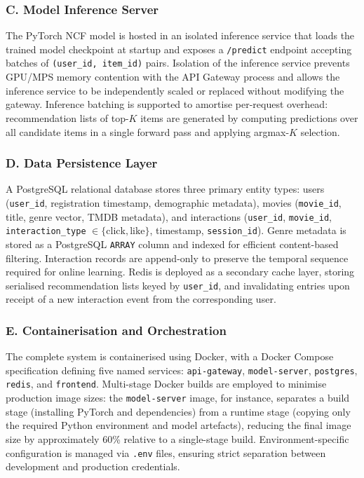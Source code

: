 \documentclass[
]{IEEEtran}
\begin{document}
\subsubsection{C. Model Inference
Server}\label{c.-model-inference-server}

The PyTorch NCF model is hosted in an isolated inference service that
loads the trained model checkpoint at startup and exposes a
\texttt{/predict} endpoint accepting batches of
\texttt{(user\_id,\ item\_id)} pairs. Isolation of the inference service
prevents GPU/MPS memory contention with the API Gateway process and
allows the inference service to be independently scaled or replaced
without modifying the gateway. Inference batching is supported to
amortise per-request overhead: recommendation lists of top-\(K\) items
are generated by computing predictions over all candidate items in a
single forward pass and applying argmax-\(K\) selection.

\subsubsection{D. Data Persistence
Layer}\label{d.-data-persistence-layer}

A PostgreSQL relational database stores three primary entity types:
users (\texttt{user\_id}, registration timestamp, demographic metadata),
movies (\texttt{movie\_id}, title, genre vector, TMDB metadata), and
interactions (\texttt{user\_id}, \texttt{movie\_id},
\texttt{interaction\_type} \(\in \{\text{click}, \text{like}\}\),
timestamp, \texttt{session\_id}). Genre metadata is stored as a
PostgreSQL \texttt{ARRAY} column and indexed for efficient content-based
filtering. Interaction records are append-only to preserve the temporal
sequence required for online learning. Redis is deployed as a secondary
cache layer, storing serialised recommendation lists keyed by
\texttt{user\_id}, and invalidating entries upon receipt of a new
interaction event from the corresponding user.

\subsubsection{E. Containerisation and
Orchestration}\label{e.-containerisation-and-orchestration}

The complete system is containerised using Docker, with a Docker Compose
specification defining five named services: \texttt{api-gateway},
\texttt{model-server}, \texttt{postgres}, \texttt{redis}, and
\texttt{frontend}. Multi-stage Docker builds are employed to minimise
production image sizes: the \texttt{model-server} image, for instance,
separates a build stage (installing PyTorch and dependencies) from a
runtime stage (copying only the required Python environment and model
artefacts), reducing the final image size by approximately 60\% relative
to a single-stage build. Environment-specific configuration is managed
via \texttt{.env} files, ensuring strict separation between development
and production credentials.
\end{document}
